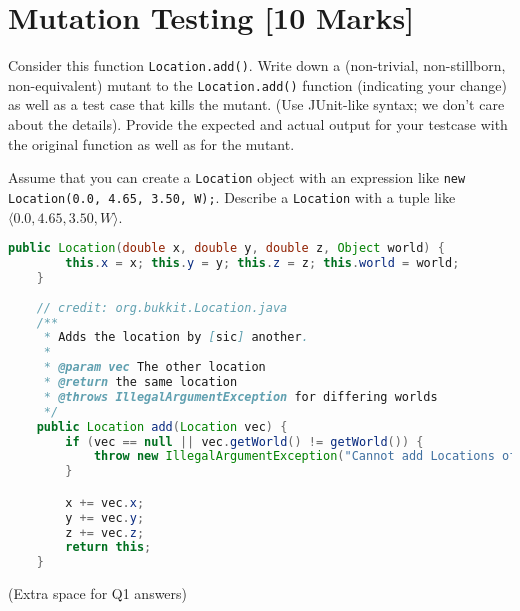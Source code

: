 \documentclass[12pt]{article}
\renewcommand{\headrulewidth}{0pt}     %
\begin{document}

%
\newpage
\renewcommand{\headrulewidth}{0.4pt}  %



\section{Mutation Testing [10 Marks]}
Consider this function {\tt Location.add()}.  Write down a (non-trivial, non-stillborn, non-equivalent) mutant to
the {\tt Location.add()} function (indicating your change) as well as a test case that kills
the mutant. (Use JUnit-like syntax; we don't care about the details).
Provide the expected and actual output for your testcase with the
original function as well as for the mutant.

\vspace*{1em}

Assume that you can create a {\tt Location}
object with an expression like {\tt new Location(0.0, 4.65, 3.50, W);}. Describe a {\tt Location} with a tuple like $\langle 0.0, 4.65, 3.50, W\rangle$.
\begin{lstlisting}[language=Java]
    public Location(double x, double y, double z, Object world) {
        this.x = x; this.y = y; this.z = z; this.world = world;
    }
  
    // credit: org.bukkit.Location.java
    /**
     * Adds the location by [sic] another.
     *
     * @param vec The other location
     * @return the same location
     * @throws IllegalArgumentException for differing worlds
     */
    public Location add(Location vec) {
        if (vec == null || vec.getWorld() != getWorld()) {
            throw new IllegalArgumentException("Cannot add Locations of differing worlds");
        }

        x += vec.x;
        y += vec.y;
        z += vec.z;
        return this;
    }
\end{lstlisting}
\newpage
(Extra space for Q1 answers)
\newpage


\end{document}
